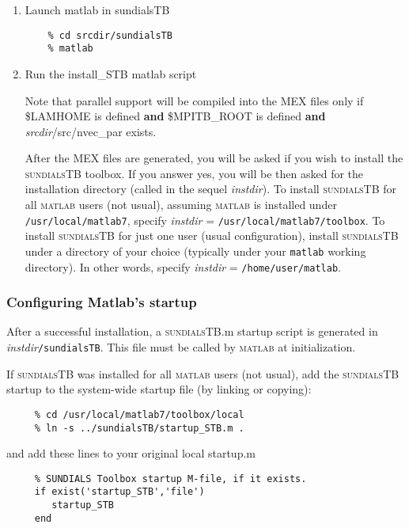 \documentclass[titlepage,10pt]{article}
\newcommand{\sundialsTB}{{\normalfont\scshape sundialsTB}}
\newcommand{\matlab}{{\normalfont\scshape matlab}}
\begin{document}
\begin{enumerate}

\item Launch matlab in sundialsTB
\begin{verbatim}
    % cd srcdir/sundialsTB
    % matlab
\end{verbatim}

\item Run the install\_STB matlab script

     Note that parallel support will be compiled into the MEX files only if
     \$LAMHOME is defined {\bf and}
     \$MPITB\_ROOT is defined {\bf and}
     {\em srcdir}/src/nvec\_par exists.

     After the MEX files are generated, you will be asked if you wish to install 
     the {\sundialsTB} toolbox. If you answer yes, you will be then asked for the
     installation directory (called in the sequel {\em instdir}). 
     To install {\sundialsTB} for all {\matlab} users (not usual), assuming {\matlab} is 
     installed under {\tt /usr/local/matlab7}, specify
        {\em instdir} = {\tt /usr/local/matlab7/toolbox}.
     To install {\sundialsTB} for just one user (usual configuration), install      
     {\sundialsTB} under a directory of your choice (typically under your {\tt matlab}
     working directory). In other words, specify
        {\em instdir} = {\tt /home/user/matlab}.

\end{enumerate}

\subsubsection{Configuring Matlab's startup}

After a successful installation, a {\sundialsTB}.m startup script is generated
in {\em instdir}{\tt /sundialsTB}. This file must be called by {\matlab} at initialization.

If {\sundialsTB} was installed for all {\matlab} users (not usual), add the {\sundialsTB} 
startup to the system-wide startup file (by linking or copying):

\begin{verbatim}
     % cd /usr/local/matlab7/toolbox/local
     % ln -s ../sundialsTB/startup_STB.m .
\end{verbatim}

and add these lines to your original local startup.m

\begin{verbatim}
     % SUNDIALS Toolbox startup M-file, if it exists.
     if exist('startup_STB','file')
        startup_STB
     end
\end{verbatim}
\end{document}

